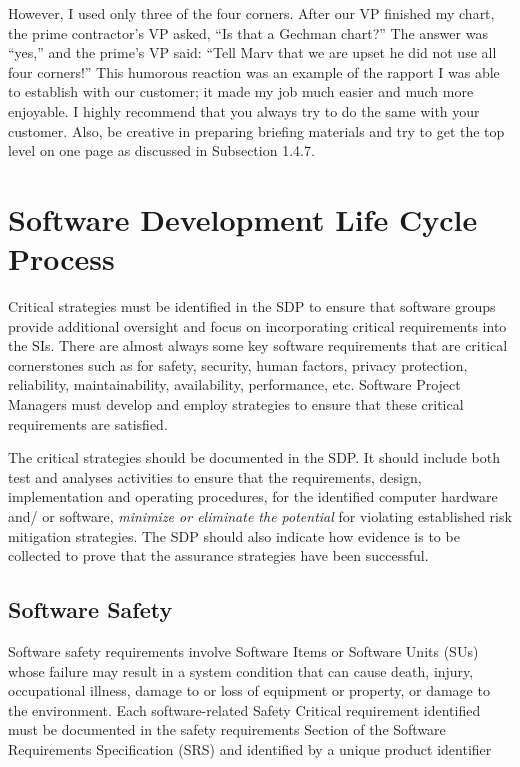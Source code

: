 However, I used only three of the four corners. After our VP finished my chart, the prime
contractor’s VP asked, “Is that a Gechman
chart?” The answer was “yes,” and the prime’s VP
said: “Tell Marv that we are upset he did not use
all four corners!” This humorous reaction was
an example of the rapport I was able to establish
with our customer; it made my job much easier
and much more enjoyable. I highly recommend that you always try to do the same with your
customer. Also, be creative in preparing briefing
materials and try to get the top level on one page
as discussed in Subsection 1.4.7.

\section{Software Development Life Cycle Process}

Critical strategies must be identified in the SDP to ensure
that software groups provide additional oversight and focus
on incorporating critical requirements into the SIs. There are
almost always some key software requirements that are critical
cornerstones such as for safety, security, human factors, privacy
protection, reliability, maintainability, availability, performance,
etc. Software Project Managers must develop and employ strategies to ensure that these critical requirements are satisfied.

The critical strategies should be documented in the SDP.
It should include both test and analyses activities to ensure
that the requirements, design, implementation and operating procedures, for the identified computer hardware and/
or software, \textit{minimize or eliminate the potential} for violating
established risk mitigation strategies. The SDP should also
indicate how evidence is to be collected to prove that the
assurance strategies have been successful.

\subsection{Software Safety}

Software safety requirements involve Software Items or
Software Units (SUs) whose failure may result in a system
condition that can cause death, injury, occupational illness,
damage to or loss of equipment or property, or damage to the
environment. Each software-related Safety Critical requirement identified must be documented in the safety requirements Section of the Software Requirements Specification
(SRS) and identified by a unique product identifier

